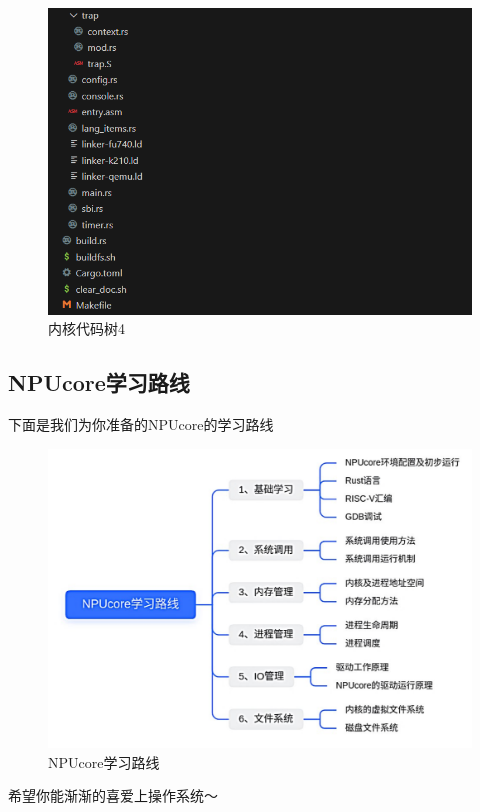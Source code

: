 \begin{figure}[htb]
	\centering
	\includegraphics[width=\textwidth]{figures/02-03-内核代码树4.png}
	\caption{
		内核代码树4
	}
	\label{fig:内核代码树4}
\end{figure}


\subsection{NPUcore学习路线}
下面是我们为你准备的NPUcore的学习路线
\begin{figure}[htb]
	\centering
	\includegraphics[width=\textwidth]{figures/02-03-NPUcore学习路线.png}
	\caption{
		NPUcore学习路线
	}
	\label{fig:NPUcore学习路线}
\end{figure}

希望你能渐渐的喜爱上操作系统～
